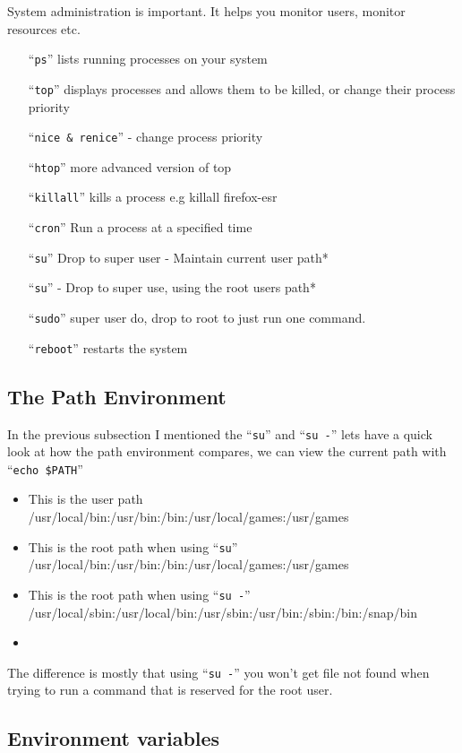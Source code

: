 \documentclass{extbook}
\begin{document}
System administration is important.  It helps you monitor users, monitor resources etc.
\begin{itemize}
\item[``\texttt{ps}''] lists running processes on your system
\item[``\texttt{top}''] displays processes and allows them to be killed, or change their process priority
\item[``\texttt{nice \& renice}''] - change process priority
\item[``\texttt{htop}''] more advanced version of top
\item[``\texttt{killall}''] kills a process e.g killall firefox-esr
\item[``\texttt{cron}''] Run a process at a specified time
\item[``\texttt{su}''] Drop to super user - Maintain current user path*
\item[``\texttt{su}''] - Drop to super use,  using the root users path* 
\item[``\texttt{sudo}''] super user do,  drop to root to just run one command.
\item[``\texttt{reboot}''] restarts the system
\end{itemize}


\subsection{The Path Environment}
 In the previous subsection I mentioned the ``\verb|su|'' and ``\verb|su -|'' lets have a quick look at how the path environment compares,  we can view the current path with ``\verb|echo $PATH|''
\begin{itemize}
\item This is the user path /usr/local/bin:/usr/bin:/bin:/usr/local/games:/usr/games
\item This is the root path when using ``\verb|su|'' /usr/local/bin:/usr/bin:/bin:/usr/local/games:/usr/games
\item This is the root path when using ``\verb|su -|'' /usr/local/sbin:/usr/local/bin:/usr/sbin:/usr/bin:/sbin:/bin:/snap/bin
\item 
\end{itemize}

The difference is mostly that using ``\verb|su -|'' you won't get file not found when trying to run a command that is reserved for the root user. 

\subsection{Environment variables}
\end{document}
